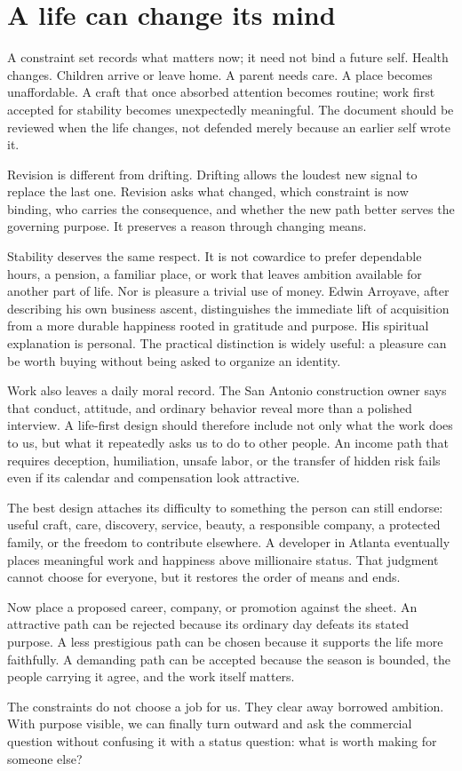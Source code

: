\section{A life can change its mind}

A constraint set records what matters now; it need not bind a future self.
Health changes. Children arrive or leave home. A parent needs care.
A place becomes unaffordable. A craft that once absorbed attention becomes
routine; work first accepted for stability becomes unexpectedly meaningful.
The document should be reviewed when the life changes, not defended merely
because an earlier self wrote it.

Revision is different from drifting. Drifting allows the loudest new signal to
replace the last one. Revision asks what changed, which constraint is now
binding, who carries the consequence, and whether the new path better serves
the governing purpose. It preserves a reason through changing means.

Stability deserves the same respect. It is not cowardice to prefer dependable
hours, a pension, a familiar place, or work that leaves ambition available for
another part of life. Nor is pleasure a trivial use of money. Edwin Arroyave,
after describing his own business ascent, distinguishes the immediate lift of
acquisition from a more durable happiness rooted in gratitude and purpose. His
spiritual explanation is personal. The practical distinction is widely useful:
a pleasure can be worth buying without being asked to organize an identity.

Work also leaves a daily moral record. The San Antonio construction owner says
that conduct, attitude, and ordinary behavior reveal more than a polished
interview. A life-first design should therefore include not only what the work
does to us, but what it repeatedly asks us to do to other people. An income path
that requires deception, humiliation, unsafe labor, or the transfer of hidden
risk fails even if its calendar and compensation look attractive.

The best design attaches its difficulty to something the person can still
endorse: useful craft, care, discovery, service, beauty, a responsible company,
a protected family, or the freedom to contribute elsewhere. A developer in
Atlanta eventually places
meaningful work and happiness above millionaire status. That judgment cannot
choose for everyone, but it restores the order of means and ends.

Now place a proposed career, company, or promotion against the sheet. An
attractive path can be rejected because its ordinary day defeats its stated
purpose. A less prestigious path can be chosen because it supports the life
more faithfully. A demanding path can be accepted because the season is
bounded, the people carrying it agree, and the work itself matters.

The constraints do not choose a job for us. They clear away borrowed ambition.
With purpose visible, we can finally turn outward and ask the commercial
question without confusing it with a status question: what is worth making for
someone else?
